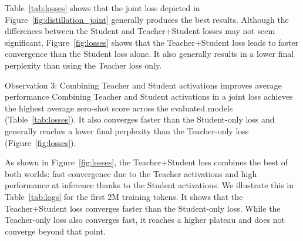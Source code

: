 Table~\ref{tab:losses} shows that the joint loss depicted in Figure~\ref{fig:distillation_joint} generally produces the best results. Although the differences between the Student and Teacher+Student losses may not seem significant, Figure~\ref{fig:losses} shows that the Teacher+Student loss leads to faster convergence than the Student loss alone. It also generally results in a lower final perplexity than using the Teacher loss only.

\begin{insightbox}{Observation 3: Combining Teacher and Student activations improves average performance}
Combining Teacher and Student activations in a joint loss achieves the highest average zero-shot score across the evaluated models (Table~\ref{tab:losses}). It also converges faster than the Student-only loss and generally reaches a lower final perplexity than the Teacher-only loss (Figure~\ref{fig:losses}).
\end{insightbox}

As shown in Figure~\ref{fig:losses}, the Teacher+Student loss combines the best of both worlds: fast convergence due to the Teacher activations and high performance at inference thanks to the Student activations. We illustrate this in Table~\ref{tab:logs} for the first 2M training tokens. It shows that the Teacher+Student loss converges faster than the Student-only loss. While the Teacher-only loss also converges fast, it reaches a higher plateau and does not converge beyond that point.

